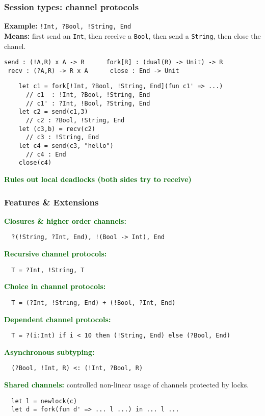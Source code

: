 \documentclass[aspectratio=169]{beamer}
\newcommand{\gemph}[1] {\textcolor{darkgreen}{\textbf{#1}}}
\begin{document}
\begin{frame}[fragile]
  \frametitle{Session types: \textbf{channel protocols}}
  \textbf{Example:} \lstinline|!Int, ?Bool, !String, End| \\
  \textbf{Means:} first send an \lstinline|Int|, then receive a \lstinline|Bool|, then send a \lstinline|String|, then close the chanel.

  \begin{lstlisting}[frame=single]
 send : (!A,R) x A -> R      fork[R] : (dual(R) -> Unit) -> R
 recv : (?A,R) -> R x A      close : End -> Unit
  \end{lstlisting}
  \begin{lstlisting}
    let c1 = fork[!Int, ?Bool, !String, End](fun c1' => ...)
      // c1  : !Int, ?Bool, !String, End
      // c1' : ?Int, !Bool, ?String, End
    let c2 = send(c1,3)
      // c2 : ?Bool, !String, End
    let (c3,b) = recv(c2)
      // c3 : !String, End
    let c4 = send(c3, "hello")
      // c4 : End
    close(c4)
  \end{lstlisting}
  \gemph{Rules out local deadlocks (both sides try to receive)}
\end{frame}

\begin{frame}[fragile]
  \frametitle{Features \& Extensions}

  \gemph{Closures \& higher order channels:}
  \begin{lstlisting}
  ?(!String, ?Int, End), !(Bool -> Int), End
  \end{lstlisting}

  \gemph{Recursive channel protocols:}
  \begin{lstlisting}
  T = ?Int, !String, T
  \end{lstlisting}

  \gemph{Choice in channel protocols:}
  \begin{lstlisting}
  T = (?Int, !String, End) + (!Bool, ?Int, End)
  \end{lstlisting}

  \gemph{Dependent channel protocols:}
  \begin{lstlisting}
  T = ?(i:Int) if i < 10 then (!String, End) else (?Bool, End)
  \end{lstlisting}

  \gemph{Asynchronous subtyping:}
  \begin{lstlisting}
  (?Bool, !Int, R) <: (!Int, ?Bool, R)
  \end{lstlisting}

  \gemph{Shared channels:} controlled non-linear usage of channels protected by locks.
  \begin{lstlisting}
  let l = newlock(c)
  let d = fork(fun d' => ... l ...) in ... l ...
  \end{lstlisting}

\end{frame}
\end{document}

